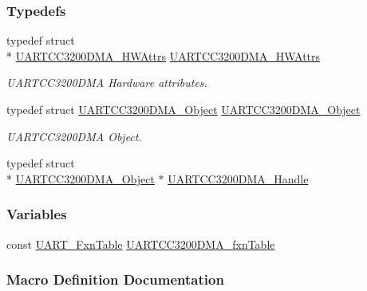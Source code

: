 \subsubsection*{Typedefs}
\begin{DoxyCompactItemize}
\item 
typedef struct \\*
\hyperlink{struct_u_a_r_t_c_c3200_d_m_a___h_w_attrs}{U\-A\-R\-T\-C\-C3200\-D\-M\-A\-\_\-\-H\-W\-Attrs} \hyperlink{_u_a_r_t_c_c3200_d_m_a_8h_a288a7e8d5d3c9cd0a6648e68bc375d47}{U\-A\-R\-T\-C\-C3200\-D\-M\-A\-\_\-\-H\-W\-Attrs}
\begin{DoxyCompactList}\small\item\em U\-A\-R\-T\-C\-C3200\-D\-M\-A Hardware attributes. \end{DoxyCompactList}\item 
typedef struct \hyperlink{struct_u_a_r_t_c_c3200_d_m_a___object}{U\-A\-R\-T\-C\-C3200\-D\-M\-A\-\_\-\-Object} \hyperlink{_u_a_r_t_c_c3200_d_m_a_8h_a44a53cd72c6cfa88e7d4a380d2992ff4}{U\-A\-R\-T\-C\-C3200\-D\-M\-A\-\_\-\-Object}
\begin{DoxyCompactList}\small\item\em U\-A\-R\-T\-C\-C3200\-D\-M\-A Object. \end{DoxyCompactList}\item 
typedef struct \\*
\hyperlink{struct_u_a_r_t_c_c3200_d_m_a___object}{U\-A\-R\-T\-C\-C3200\-D\-M\-A\-\_\-\-Object} $\ast$ \hyperlink{_u_a_r_t_c_c3200_d_m_a_8h_a70e67a368f2ea5e94586d886f5432d88}{U\-A\-R\-T\-C\-C3200\-D\-M\-A\-\_\-\-Handle}
\end{DoxyCompactItemize}
\subsubsection*{Variables}
\begin{DoxyCompactItemize}
\item 
const \hyperlink{struct_u_a_r_t___fxn_table}{U\-A\-R\-T\-\_\-\-Fxn\-Table} \hyperlink{_u_a_r_t_c_c3200_d_m_a_8h_a21db4fb893627de050a47e19bbef9866}{U\-A\-R\-T\-C\-C3200\-D\-M\-A\-\_\-fxn\-Table}
\end{DoxyCompactItemize}


\subsubsection{Macro Definition Documentation}
